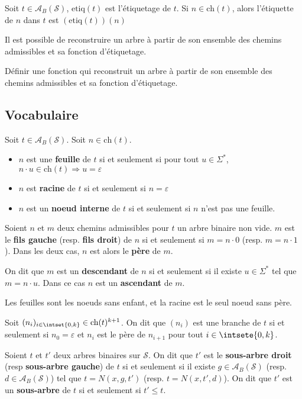 \documentclass{scrartcl}
\begin{document}
			Soit $t \in \mathscr{A}_B(\mathcal{S})$, $\text{etiq}(t)$ est l'étiquetage de $t$.
			Si $n \in \text{ch}(t)$, alors l'étiquette de $n$ dans $t$ est $\left(\text{etiq}(t)\right)(n)$

			\rem Il est possible de reconstruire un arbre à partir de son ensemble des chemins admissibles et sa fonction d'étiquetage.

			\exo Définir une fonction qui reconstruit un arbre à partir de son ensemble des chemins admissibles et sa fonction d'étiquetage.

		
		\subsection{Vocabulaire}
			Soit $t \in \mathscr{A}_B(\mathcal{S})$.
			Soit $n \in \text{ch}(t)$.
			\begin{itemize}
				\item $n$ est une \textbf{feuille} de $t$ si et seulement si pour tout $u \in \Sigma^*$, $n\cdot u \in \text{ch}(t) \Rightarrow u=\varepsilon$
				\item $n$ est \textbf{racine} de $t$ si et seulement si $n = \varepsilon$
				\item $n$ est un \textbf{noeud interne} de $t$ si et seulement si $n$ n'est pas une feuille.
			\end{itemize}
			
			
			Soient $n$ et $m$ deux chemins admissibles pour $t$ un arbre binaire non vide.
			$m$ est le \textbf{fils gauche} (resp. \textbf{fils droit}) de $n$ si et seulement si $m = n\cdot 0$ (resp. $m = n \cdot 1$).
			Dans les deux cas, $n$ est alors le \textbf{père} de $m$.

			On dit que $m$ est un \textbf{descendant} de $n$ si et seulement si il existe $u \in \Sigma^*$ tel que $m = n \cdot u$.
			Dans ce cas $n$ est un \textbf{ascendant} de $m$.

			\rem Les feuilles sont les noeuds sans enfant, et la racine est le seul noeud sans père.

			Soit $(n_i)_{i \in \intset{0,k}} \in \text{ch}(t)^{k+1}$.
			On dit que $(n_i)$ est une branche de $t$ si et seulement si $n_0 = \varepsilon$ et $n_i$ est le père de $n_{i+1}$ pour tout $i \in \intsete{0,k}$.
			
			Soient $t$ et $t'$ deux arbres binaires sur $\mathcal{S}$. On dit que $t'$ est le \textbf{sous-arbre droit} (resp \textbf{sous-arbre gauche}) de $t$
			si et seulement si il existe $g \in \mathscr{A}_B(\mathcal{S})$ (resp. $d \in \mathscr{A}_B(\mathcal{S})$) tel que $t = N(x,g,t')$ (resp. $t = N(x,t',d)$).
			On dit que $t'$ est un \textbf{sous-arbre} de $t$ si et seulement si $t' \leq t$.
\end{document}
